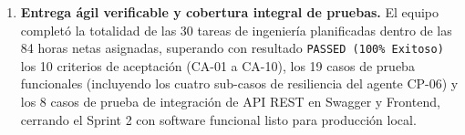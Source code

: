 \documentclass[11pt,a4paper]{article}
\begin{document}
\begin{enumerate}
  \item \textbf{Entrega ágil verificable y cobertura integral de pruebas.} El equipo completó la totalidad de las 30 tareas de ingeniería planificadas dentro de las 84 horas netas asignadas, superando con resultado \texttt{PASSED (100\% Exitoso)} los 10 criterios de aceptación (CA-01 a CA-10), los 19 casos de prueba funcionales (incluyendo los cuatro sub-casos de resiliencia del agente CP-06) y los 8 casos de prueba de integración de API REST en Swagger y Frontend, cerrando el Sprint 2 con software funcional listo para producción local.
\end{enumerate}
\end{document}
